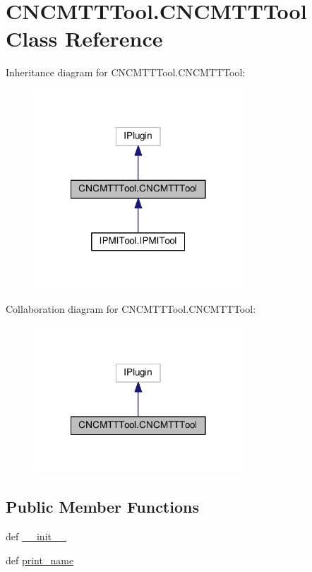 \hypertarget{classCNCMTTTool_1_1CNCMTTTool}{\section{C\-N\-C\-M\-T\-T\-Tool.\-C\-N\-C\-M\-T\-T\-Tool Class Reference}
\label{classCNCMTTTool_1_1CNCMTTTool}
}


Inheritance diagram for C\-N\-C\-M\-T\-T\-Tool.\-C\-N\-C\-M\-T\-T\-Tool\-:
\nopagebreak
\begin{figure}[H]
\begin{center}
\leavevmode
\includegraphics[width=222pt]{classCNCMTTTool_1_1CNCMTTTool__inherit__graph}
\end{center}
\end{figure}


Collaboration diagram for C\-N\-C\-M\-T\-T\-Tool.\-C\-N\-C\-M\-T\-T\-Tool\-:
\nopagebreak
\begin{figure}[H]
\begin{center}
\leavevmode
\includegraphics[width=222pt]{classCNCMTTTool_1_1CNCMTTTool__coll__graph}
\end{center}
\end{figure}
\subsection*{Public Member Functions}
\begin{DoxyCompactItemize}
\item 
def \hyperlink{classCNCMTTTool_1_1CNCMTTTool_a9f2d86b7cd592cae84be27e90d65f862}{\-\_\-\-\_\-init\-\_\-\-\_\-}
\item 
def \hyperlink{classCNCMTTTool_1_1CNCMTTTool_a664d4cdf650553342d45bf04981a8e2d}{print\-\_\-name}
\end{DoxyCompactItemize}


